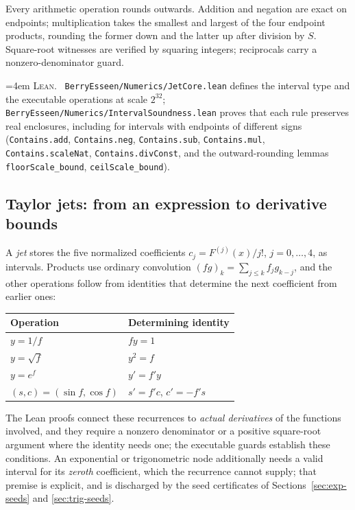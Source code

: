 \documentclass[10pt,a4paper]{article}
\theoremstyle{plain}
\theoremstyle{definition}
\newcommand{\lean}[1]{\texttt{#1}}
\newcommand{\file}[1]{\texttt{#1}}
\newenvironment{leanref}%
  {\par\addvspace{3pt}\begingroup\sloppy\emergencystretch=4em
   \noindent\footnotesize\textsc{Lean.}\ \ignorespaces}%
  {\par\endgroup\addvspace{3pt}}
\begin{document}
Every arithmetic operation rounds outwards. Addition and negation are exact on
endpoints; multiplication takes the smallest and largest of the four endpoint
products, rounding the former down and the latter up after division by $S$.
Square-root witnesses are verified by squaring integers; reciprocals carry a
nonzero-denominator guard.

\begin{leanref}
\file{BerryEsseen/Numerics/JetCore.lean} defines the interval type and the
executable operations at scale $2^{32}$;
\file{BerryEsseen/Numerics/IntervalSoundness.lean} proves that each rule
preserves real enclosures, including for intervals with endpoints of different
signs (\lean{Contains.add}, \lean{Contains.neg}, \lean{Contains.sub},
\lean{Contains.mul}, \lean{Contains.scaleNat}, \lean{Contains.divConst}, and the
outward-rounding lemmas \lean{floorScale\_bound}, \lean{ceilScale\_bound}).
\end{leanref}

\subsection{Taylor jets: from an expression to derivative bounds}

A \emph{jet} stores the five normalized coefficients
$c_j=F^{(j)}(x)/j!$, $j=0,\dots,4$, as intervals. Products use ordinary
convolution $(fg)_k=\sum_{j\le k}f_jg_{k-j}$, and the other operations follow
from identities that determine the next coefficient from earlier ones:
\begin{center}
\begin{tabular}{@{}ll@{}}
\toprule
Operation & Determining identity \\
\midrule
$y=1/f$ & $fy=1$ \\
$y=\sqrt f$ & $y^2=f$ \\
$y=e^{f}$ & $y'=f'y$ \\
$(s,c)=(\sin f,\cos f)$ & $s'=f'c$, $c'=-f's$ \\
\bottomrule
\end{tabular}
\end{center}
The Lean proofs connect these recurrences to \emph{actual derivatives} of the
functions involved, and they require a nonzero denominator or a positive
square-root argument where the identity needs one; the executable guards
establish these conditions. An exponential or trigonometric node additionally
needs a valid interval for its \emph{zeroth} coefficient, which the recurrence
cannot supply; that premise is explicit, and is discharged by the seed
certificates of Sections~\ref{sec:exp-seeds} and \ref{sec:trig-seeds}.
\end{document}
